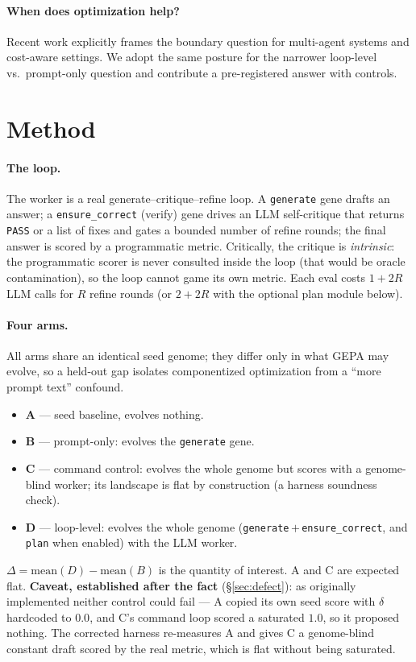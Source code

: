 \documentclass[11pt]{article}
\newcommand{\dd}{\ensuremath{\Delta}}
\begin{document}
\paragraph{When does optimization help?}
Recent work explicitly frames the boundary question for multi-agent systems and
cost-aware settings. We adopt the same posture for the narrower loop-level vs.\
prompt-only question and contribute a pre-registered answer with controls.

\section{Method}
\label{sec:method}

\paragraph{The loop.}
The worker is a real generate--critique--refine loop. A \texttt{generate} gene
drafts an answer; a \texttt{ensure\_correct} (verify) gene drives an LLM
self-critique that returns \texttt{PASS} or a list of fixes and gates a bounded
number of refine rounds; the final answer is scored by a programmatic metric.
Critically, the critique is \emph{intrinsic}: the programmatic scorer is never
consulted inside the loop (that would be oracle contamination), so the loop
cannot game its own metric. Each eval costs $1 + 2R$ LLM calls for $R$ refine
rounds (or $2 + 2R$ with the optional plan module below).

\paragraph{Four arms.}
All arms share an identical seed genome; they differ only in what GEPA may
evolve, so a held-out gap isolates componentized optimization from a
``more prompt text'' confound.
\begin{itemize}
  \item \textbf{A} --- seed baseline, evolves nothing.
  \item \textbf{B} --- prompt-only: evolves the \texttt{generate} gene.
  \item \textbf{C} --- command control: evolves the whole genome but scores with
    a genome-blind worker; its landscape is flat by construction (a harness
    soundness check).
  \item \textbf{D} --- loop-level: evolves the whole genome
    (\texttt{generate}\,$+$\,\texttt{ensure\_correct}, and \texttt{plan} when
    enabled) with the LLM worker.
\end{itemize}
$\dd = \mathrm{mean}(D) - \mathrm{mean}(B)$ is the quantity of interest.
A and C are expected flat. \textbf{Caveat, established after the fact}
(\S\ref{sec:defect}): as originally implemented neither control could fail --- A copied its
own seed score with $\delta$ hardcoded to $0.0$, and C's command loop scored a saturated
$1.0$, so it proposed nothing. The corrected harness re-measures A and gives C a
genome-blind constant draft scored by the real metric, which is flat without being
saturated.
\end{document}
